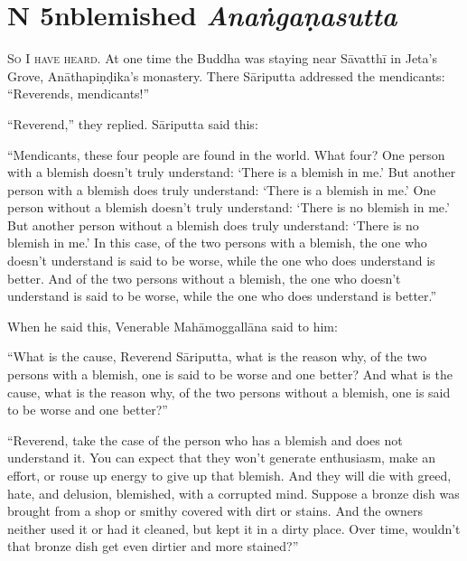 \documentclass[12pt,openany]{book}%
\newcommand*{\suttatitleacronym}[1]{\smaller[2]{#1}\vspace*{.3em}}
\newcommand*{\suttatitletranslation}[1]{\linebreak{#1}}
\newcommand*{\suttatitleroot}[1]{\linebreak\smaller[2]\itshape{#1}}
\newcommand*{\tocacronym}[1]{\hspace*{-3.3em}{#1}\quad}
\newcommand*{\toctranslation}[1]{#1}
\newcommand*{\tocroot}[1]{(\textit{#1})}
\newcommand*{\scevam}[1]{\textsc{#1}}
\begin{document}
%
\section*{{\suttatitleacronym MN 5}{\suttatitletranslation Unblemished }{\suttatitleroot Anaṅgaṇasutta}}
\addcontentsline{toc}{section}{\tocacronym{MN 5} \toctranslation{Unblemished } \tocroot{Anaṅgaṇasutta}}

\scevam{So I have heard. }At one time the Buddha was staying near \textsanskrit{Sāvatthī} in Jeta’s Grove, \textsanskrit{Anāthapiṇḍika}’s monastery. There \textsanskrit{Sāriputta} addressed the mendicants: “Reverends, mendicants!” 

“Reverend,” they replied. \textsanskrit{Sāriputta} said this: 

“Mendicants, these four people are found in the world. What four? One person with a blemish doesn’t truly understand: ‘There is a blemish in me.’ But another person with a blemish does truly understand: ‘There is a blemish in me.’ One person without a blemish doesn’t truly understand: ‘There is no blemish in me.’ But another person without a blemish does truly understand: ‘There is no blemish in me.’ In this case, of the two persons with a blemish, the one who doesn’t understand is said to be worse, while the one who does understand is better. And of the two persons without a blemish, the one who doesn’t understand is said to be worse, while the one who does understand is better.” 

When he said this, Venerable \textsanskrit{Mahāmoggallāna} said to him: 

“What is the cause, Reverend \textsanskrit{Sāriputta}, what is the reason why, of the two persons with a blemish, one is said to be worse and one better? And what is the cause, what is the reason why, of the two persons without a blemish, one is said to be worse and one better?” 

“Reverend, take the case of the person who has a blemish and does not understand it. You can expect that they won’t generate enthusiasm, make an effort, or rouse up energy to give up that blemish. And they will die with greed, hate, and delusion, blemished, with a corrupted mind. Suppose a bronze dish was brought from a shop or smithy covered with dirt or stains. And the owners neither used it or had it cleaned, but kept it in a dirty place. Over time, wouldn’t that bronze dish get even dirtier and more stained?” 
\end{document}
